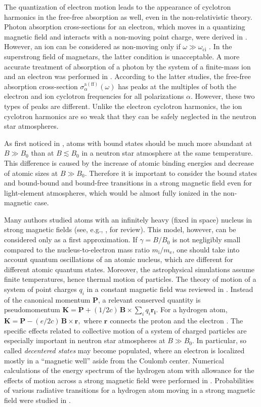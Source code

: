 \documentclass{pos1}
\newcommand{\mel}{m_\mathrm{e}}
\newcommand{\mion}{m_\mathrm{i}}
\newcommand{\omci}{\omega_\mathrm{ci}}
\begin{document}
The quantization of electron motion leads to the appearance of
cyclotron harmonics in the free-free absorption as well, even in the
non-relativistic theory. Photon absorption cross-sections for an
electron, which moves in a quantizing magnetic field and interacts with
a non-moving point charge, were derived in \cite{PavlovPanov}. However,
an ion can be considered as non-moving only if $\omega \gg \omci$
\cite{Ginzburg}. In the
superstrong field of magnetars, the latter condition is unacceptable.
A more accurate treatment of absorption of a photon by the system of a
finite-mass ion and an electron was performed in \cite{PC03,P10}.
According to the latter studies, the free-free absorption cross-section
$\sigma_\alpha^\mathrm{a(ff)}(\omega)$ has peaks at the
multiples of both the electron and ion cyclotron frequencies for all
polarizations $\alpha$. However, these two types of peaks are
different. Unlike the electron cyclotron harmonics, the ion cyclotron
harmonics are so weak that they can be safely neglected in the neutron
star atmospheres.

As first noticed in \cite{CLR70}, atoms with bound states should be
much more abundant at $B\gg B_0$ than at $B\lesssim B_0$ in a neutron
star atmosphere at the same temperature. This difference is caused by
the increase of atomic binding energies and decrease of atomic sizes
at $B\gg B_0$. Therefore it is important to consider the bound states
and bound-bound and bound-free transitions in a strong magnetic field
even for light-element atmospheres, which would be almost fully
ionized in the non-magnetic case.

Many authors studied atoms with an infinitely heavy (fixed in space)
nucleus in strong magnetic fields (see, e.g., \cite{Ruder_ea,Lai01}, for
review). This model, however, can be considered only as a
first approximation. If $\gamma=B/B_0$ is not negligibly small compared to
the nucleus-to-electron mass ratio $\mion/\mel$, one should take into
account quantum oscillations of an atomic nucleus, which are different
for different atomic quantum states. Moreover, the astrophysical
simulations assume finite temperatures, hence thermal motion of
particles. The theory of motion of a system of point charges $q_i$ in
a constant magnetic field was reviewed in \cite{JHY83}. Instead of the
canonical momentum $\bm{P}$, a relevant conserved quantity is
pseudomomentum 
$
   \bm{K}=\bm{P}+(1/2c)\,\bm{B}\times\sum_i q_i \bm{r_i}.
$
For a hydrogen atom,
$
   \bm{K} = \bm{P} - ({e}/{2c})\,\bm{B}\times \bm{r},
$
where $\bm{r}$ connects the proton and the electron
\cite{GorkovDzyal}. The specific effects related to collective motion
of a system of charged particles are especially important in neutron
star atmospheres at $B\gg B_0$. In particular, so called
\emph{decentered states} may become populated, where an electron is
localized mostly in a ``magnetic well'' aside from the Coulomb center.
Numerical calculations of the energy spectrum of the hydrogen atom
with allowance for the effects of motion across a strong magnetic
field were performed in  \cite{VDB92,P94}. Probabilities of various
radiative transitions for a hydrogen atom moving in a strong magnetic
field were studied in \cite{P94,PP95,PP97}.
\end{document}
